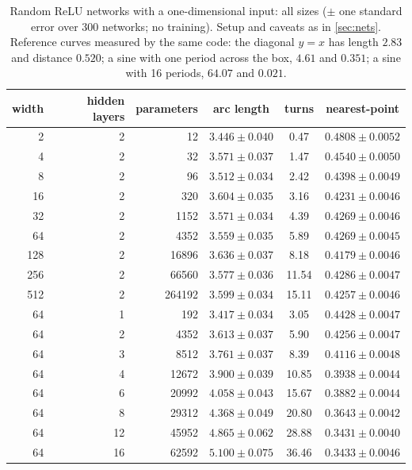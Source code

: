 \begin{table}[h]
  \caption{Random ReLU networks with a one-dimensional input: all sizes
  ($\pm$ one standard error over 300 networks; no training). Setup and caveats
  as in \cref{sec:nets}. Reference curves measured by the same code: the
  diagonal $y=x$ has length $2.83$ and distance $0.520$; a sine with one period
  across the box, $4.61$ and $0.351$; a sine with 16 periods, $64.07$ and
  $0.021$.}
  \label{tab:relu-full}
  \centering
  \begin{tabular}{rrrccc}
    \toprule
    width & hidden layers & parameters & arc length & turns & nearest-point \\
    \midrule
      2 & 2 &      12 & $3.446\pm0.040$ &  0.47 & $0.4808\pm0.0052$ \\
      4 & 2 &      32 & $3.571\pm0.037$ &  1.47 & $0.4540\pm0.0050$ \\
      8 & 2 &      96 & $3.512\pm0.034$ &  2.42 & $0.4398\pm0.0049$ \\
     16 & 2 &     320 & $3.604\pm0.035$ &  3.16 & $0.4231\pm0.0046$ \\
     32 & 2 &    1152 & $3.571\pm0.034$ &  4.39 & $0.4269\pm0.0046$ \\
     64 & 2 &    4352 & $3.559\pm0.035$ &  5.89 & $0.4269\pm0.0045$ \\
    128 & 2 &   16896 & $3.636\pm0.037$ &  8.18 & $0.4179\pm0.0046$ \\
    256 & 2 &   66560 & $3.577\pm0.036$ & 11.54 & $0.4286\pm0.0047$ \\
    512 & 2 &  264192 & $3.599\pm0.034$ & 15.11 & $0.4257\pm0.0046$ \\
    \midrule
     64 &  1 &    192 & $3.417\pm0.034$ &  3.05 & $0.4428\pm0.0047$ \\
     64 &  2 &   4352 & $3.613\pm0.037$ &  5.90 & $0.4256\pm0.0047$ \\
     64 &  3 &   8512 & $3.761\pm0.037$ &  8.39 & $0.4116\pm0.0048$ \\
     64 &  4 &  12672 & $3.900\pm0.039$ & 10.85 & $0.3938\pm0.0044$ \\
     64 &  6 &  20992 & $4.058\pm0.043$ & 15.67 & $0.3882\pm0.0044$ \\
     64 &  8 &  29312 & $4.368\pm0.049$ & 20.80 & $0.3643\pm0.0042$ \\
     64 & 12 &  45952 & $4.865\pm0.062$ & 28.88 & $0.3431\pm0.0040$ \\
     64 & 16 &  62592 & $5.100\pm0.075$ & 36.46 & $0.3433\pm0.0046$ \\
    \bottomrule
  \end{tabular}
\end{table}

